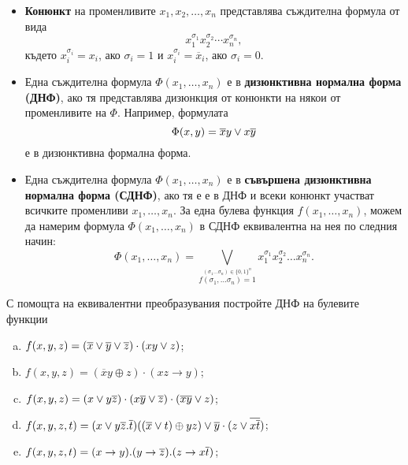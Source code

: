 \begin{itemize}
\item
  {\bf Конюнкт} на променливите $x_1,x_2,\dots,x_n$ представлява съждителна формула от вида 
  \[x^{\sigma_1}_1x^{\sigma_2}_2 \cdots x^{\sigma_n}_n,\]
  където $x^{\sigma_i}_i = x_i$, ако $\sigma_i = 1$ и $x^{\sigma_i}_i = \overline{x}_i$, ако $\sigma_i = 0$.
\item
  Една съждителна формула $\Phi(x_1,\dots,x_n)$ е в {\bf дизюнктивна нормална форма (ДНФ)}, ако
  тя представлява дизюнкция от конюнкти на някои от променливите на $\Phi$.
  Например, формулата 
  \[\Phi(x,y) = \overline{x}y \vee x\overline{y}\]
  е в дизюнктивна формална форма.
\item
  Една съждителна формула $\Phi(x_1,\dots,x_n)$ е в {\bf съвършена дизюнктивна нормална форма (СДНФ)}, ако
  тя е е в ДНФ и всеки конюнкт участват всичките променливи $x_1,\dots,x_n$.
  За една булева функция $f(x_1,\dots,x_n)$, можем да намерим формула $\Phi(x_1,\dots,x_n)$ в СДНФ еквивалентна на нея по следния начин:
  \[\Phi(x_1,\dots,x_n) = \bigvee_{\stackrel{(\sigma_1\dots \sigma_n) \in \{0,1\}^n}{f(\sigma_1, \dots \sigma_n) = 1}}x_1^{\sigma_1}x_2^{\sigma_2}\dots x_n^{\sigma_n}.\]
\end{itemize}

\begin{problem} %
  С помощта на еквивалентни преобразувания постройте ДНФ на булевите функции
  \begin{enumerate}[a)]
  \item
    $f(x,y,z) = (\overline{x}\vee\overline{y}\vee\overline{z})\cdot(xy\vee z)$;
  \item
    $f(x,y,z) = (\overline{x}y\oplus z)\cdot(xz\rightarrow y)$;
  \item
    $f(x,y,z) = (x\vee y\overline{z})\cdot(x\overline{y}\vee\overline{z})\cdot(\overline{xy}\vee z)$;
  \item
    $f(x,y,z,t) = (x\vee y\overline{z}.\overline{t})((\overline{x}\vee t)\oplus yz)\vee \overline{y}\cdot(z\vee \overline{x\overline{t}})$;
  \item
    $f(x,y,z,t) = (x\rightarrow y).(y\rightarrow \overline{z}).(z\rightarrow x\overline{t})$;
  \end{enumerate}
\end{problem}

